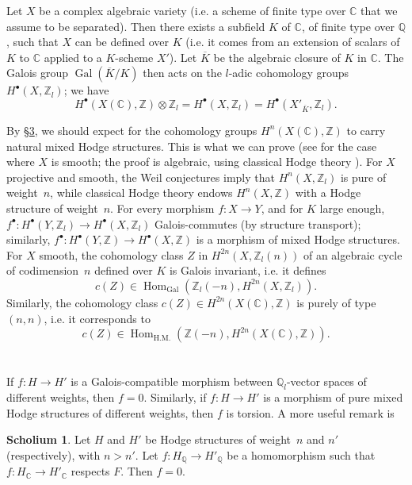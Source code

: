\documentclass{article}
\theoremstyle{plain}
\theoremstyle{definition}
\newtheorem*{scholium*}{Scholium}
\newcommand{\ZZ}{\mathbb{Z}}
\newcommand{\QQ}{\mathbb{Q}}
\newcommand{\CC}{\mathbb{C}}
\DeclareMathOperator{\Gal}{Gal}
\DeclareMathOperator{\Hom}{Hom}
\newcommand{\oldpage}[1]{\marginpar{\footnotesize$\Big\vert$ \textit{p.~#1}}}
\begin{document}
Let $X$ be a complex algebraic variety (i.e. a scheme of finite type over $\CC$ that we assume to be separated).
Then there exists a subfield $K$ of $\CC$, of finite type over $\QQ$, such that $X$ can be defined over $K$ (i.e. it comes from an extension of scalars of $K$ to $\CC$ applied to a $K$-scheme $X'$).
Let $\overline{K}$ be the algebraic closure of $K$ in $\CC$.
The Galois group $\Gal(\overline{K}/K)$ then acts on the $l$-adic cohomology groups $H^\bullet(X,\ZZ_l)$;
we have
\[
  H^\bullet(X(\CC),\ZZ)\otimes\ZZ_l
  = H^\bullet(X,\ZZ_l)
  = H^\bullet(X'_{\overline{K}},\ZZ_l).
\]

\oldpage{427}
By \hyperref[3]{\S3}, we should expect for the cohomology groups $H^n(X(\CC),\ZZ)$ to carry natural mixed Hodge structures.
This is what we can prove (see \cite[3.2.5]{1} for the case where $X$ is smooth; the proof is algebraic, using classical Hodge theory \cite{6}).
For $X$ projective and smooth, the Weil conjectures imply that $H^n(X,\ZZ_l)$ is pure of weight~$n$, while classical Hodge theory endows $H^n(X,\ZZ)$ with a Hodge structure of weight~$n$.
For every morphism $f\colon X\to Y$, and for $K$ large enough, $f^\bullet\colon H^\bullet(Y,\ZZ_l)\to H^\bullet(X,\ZZ_l)$ Galois-commutes (by structure transport);
similarly, $f^\bullet\colon H^\bullet(Y,\ZZ)\to H^\bullet(X,\ZZ)$ is a morphism of mixed Hodge structures.
For $X$ smooth, the cohomology class $Z$ in $H^{2n}(X,\ZZ_l(n))$ of an algebraic cycle of codimension~$n$ defined over $K$ is Galois invariant, i.e. it defines
\[
  c(Z) \in \Hom_{\Gal}(\ZZ_l(-n),H^{2n}(X,\ZZ_l)).
\]
Similarly, the cohomology class $c(Z)\in H^{2n}(X(\CC),\ZZ)$ is purely of type~$(n,n)$, i.e. it corresponds to
\[
  c(Z) \in \Hom_{\mathrm{H.M.}}(\ZZ(-n),H^{2n}(X(\CC),\ZZ)).
\]


\section{}
\label{5}

If $f\colon H\to H'$ is a Galois-compatible morphism between $\QQ_l$-vector spaces of different weights, then $f=0$.
Similarly, if $f\colon H\to H'$ is a morphism of pure mixed Hodge structures of different weights, then $f$ is torsion.
A more useful remark is

\begin{scholium*}
  Let $H$ and $H'$ be Hodge structures of weight~$n$ and $n'$ (respectively), with $n>n'$.
  Let $f\colon H_\QQ\to H'_\QQ$ be a homomorphism such that $f\colon H_\CC\to H'_\CC$ respects $F$.
  Then $f=0$.
\end{scholium*}
\end{document}
